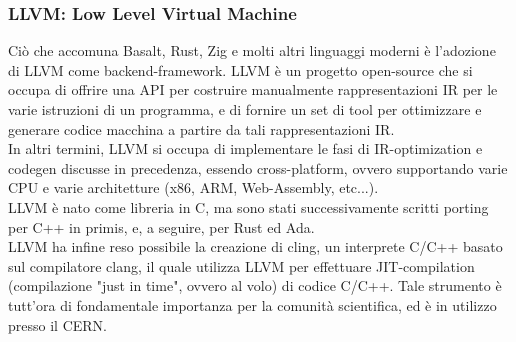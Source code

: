 \subsubsection{LLVM: Low Level Virtual Machine}
Ciò che accomuna Basalt, Rust, Zig e molti altri linguaggi moderni è l'adozione di LLVM 
come backend-framework. LLVM è un progetto open-source che si occupa di offrire una API 
per costruire manualmente rappresentazioni IR per le varie istruzioni di un programma, 
e di fornire un set di tool per ottimizzare e generare codice macchina a partire
da tali rappresentazioni IR. \\ 

In altri termini, LLVM si occupa di implementare le fasi di IR-optimization e 
codegen discusse in precedenza, essendo cross-platform, ovvero supportando 
varie CPU e varie architetture (x86, ARM, Web-Assembly, etc...). \\

LLVM è nato come libreria in C, ma sono stati successivamente scritti porting 
per C++ in primis, e, a seguire, per Rust ed Ada. \\

LLVM ha infine reso possibile la creazione di cling, un interprete C/C++ basato 
sul compilatore clang, il quale utilizza LLVM per effettuare JIT-compilation 
(compilazione "just in time", ovvero al volo) di codice C/C++. Tale 
strumento è tutt'ora di fondamentale importanza per la comunità scientifica, 
ed è in utilizzo presso il CERN.
